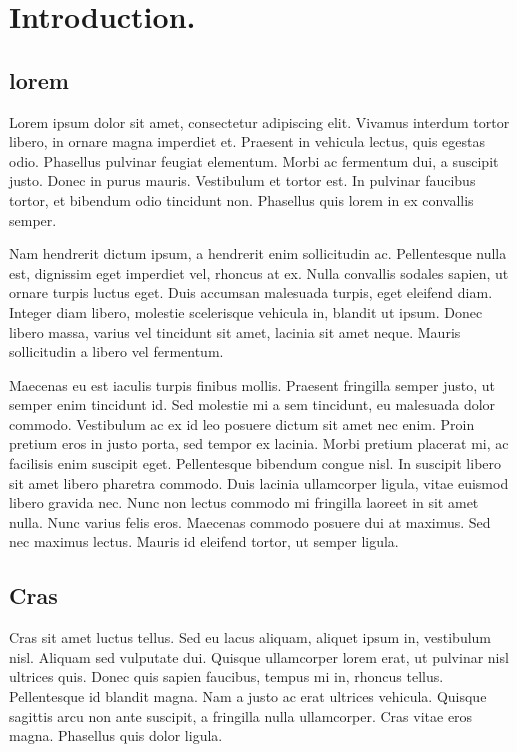 \chapter{\label{ch:introduction} Introduction.}

\section{lorem}
Lorem ipsum dolor sit amet, consectetur adipiscing elit. Vivamus interdum tortor libero, in ornare magna imperdiet et. Praesent in vehicula lectus, quis egestas odio. Phasellus pulvinar feugiat elementum. Morbi ac fermentum dui, a suscipit justo. Donec in purus mauris. Vestibulum et tortor est. In pulvinar faucibus tortor, et bibendum odio tincidunt non. Phasellus quis lorem in ex convallis semper.

Nam hendrerit dictum ipsum, a hendrerit enim sollicitudin ac. Pellentesque nulla est, dignissim eget imperdiet vel, rhoncus at ex. Nulla convallis sodales sapien, ut ornare turpis luctus eget. Duis accumsan malesuada turpis, eget eleifend diam. Integer diam libero, molestie scelerisque vehicula in, blandit ut ipsum. Donec libero massa, varius vel tincidunt sit amet, lacinia sit amet neque. Mauris sollicitudin a libero vel fermentum.

Maecenas eu est iaculis turpis finibus mollis. Praesent fringilla semper justo, ut semper enim tincidunt id. Sed molestie mi a sem tincidunt, eu malesuada dolor commodo. Vestibulum ac ex id leo posuere dictum sit amet nec enim. Proin pretium eros in justo porta, sed tempor ex lacinia. Morbi pretium placerat mi, ac facilisis enim suscipit eget. Pellentesque bibendum congue nisl. In suscipit libero sit amet libero pharetra commodo. Duis lacinia ullamcorper ligula, vitae euismod libero gravida nec. Nunc non lectus commodo mi fringilla laoreet in sit amet nulla. Nunc varius felis eros. Maecenas commodo posuere dui at maximus. Sed nec maximus lectus. Mauris id eleifend tortor, ut semper ligula.

\section{Cras}
Cras sit amet luctus tellus. Sed eu lacus aliquam, aliquet ipsum in, vestibulum nisl. Aliquam sed vulputate dui. Quisque ullamcorper lorem erat, ut pulvinar nisl ultrices quis. Donec quis sapien faucibus, tempus mi in, rhoncus tellus. Pellentesque id blandit magna. Nam a justo ac erat ultrices vehicula. Quisque sagittis arcu non ante suscipit, a fringilla nulla ullamcorper. Cras vitae eros magna. Phasellus quis dolor ligula.

